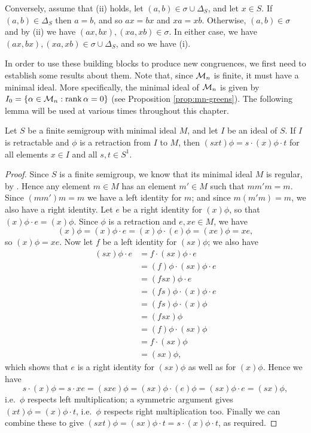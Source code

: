 Conversely, assume that (ii) holds, let $(a,b) \in \sigma \cup \Delta_S$, and
let $x \in S$.  If $(a,b) \in \Delta_S$ then $a=b$, and so $ax=bx$ and $xa=xb$.
Otherwise, $(a,b) \in \sigma$ and by (ii) we have $(ax,bx),(xa,xb) \in \sigma$.
In either case, we have $(ax,bx),(xa,xb) \in \sigma \cup \Delta_S$, and so we
have (i).

In order to use these building blocks to produce new congruences, we first need
to establish some results about them.  Note that, since $\mathcal{M}_n$ is finite, it
must have a minimal ideal.  More specifically, the minimal ideal of $\mathcal{M}_n$ is
given by $I_0 = \{\alpha \in \mathcal{M}_n : \operatorname{rank} \alpha = 0\}$ (see Proposition
\ref{prop:mn-greens}).  The following lemma will be used at various times
throughout this chapter.

\begin{lemma}
  \label{lem:retract-aux}
  Let $S$ be a finite semigroup with minimal ideal $M$, and let $I$ be
  an ideal of $S$.  If $I$ is retractable and $\phi$ is a
  retraction from $I$ to $M$, then $(sxt)\phi=s \cdot (x)\phi \cdot t$ for all
  elements $x \in I$ and all $s,t\in S^1$.
  \begin{proof}
    Since $S$ is a finite semigroup, we know that its minimal ideal $M$ is
    regular, by \cite[Proposition 3.1.4]{howie}.  Hence
    any element $m \in M$ has an element $m' \in M$ such that $mm'm = m$.  Since $(mm')m=m$ we
    have a left identity for $m$; and since $m(m'm) = m$, we also have a right
    identity.  Let $e$ be a right identity for $(x)\phi$, so that
    $(x)\phi \cdot e = (x)\phi$.  Since $\phi$ is a retraction and
    $e, xe \in M$, we have
    $$(x)\phi=(x)\phi \cdot e = (x)\phi \cdot (e)\phi = (xe)\phi = xe,$$
    so $(x)\phi = xe$.
    Now let $f$ be a left identity for $(sx)\phi$; we also
    have
    \begin{align*}
      (sx)\phi \cdot e & = f \cdot (sx)\phi \cdot e \\
      & = (f)\phi \cdot (sx)\phi \cdot e \\
      & = (fsx)\phi \cdot e \\
      & = (fs)\phi \cdot (x)\phi \cdot e \\
      & = (fs)\phi \cdot (x)\phi \\
      & = (fsx)\phi \\
      & = (f)\phi \cdot (sx)\phi \\
      & = f \cdot (sx)\phi \\
      & = (sx)\phi,
    \end{align*}
    which shows that $e$ is a right identity for $(sx)\phi$ as well as for
    $(x)\phi$.  Hence we have
    $$s \cdot (x)\phi = s \cdot xe = (sxe)\phi = (sx)\phi \cdot (e)\phi =
    (sx)\phi \cdot e = (sx)\phi,$$ i.e.~$\phi$ respects left multiplication; a
    symmetric argument gives $(xt)\phi = (x)\phi \cdot t$, i.e.~$\phi$ respects
    right multiplication too.  Finally we can combine these to give
    $(sxt)\phi = (sx)\phi \cdot t = s \cdot (x)\phi \cdot t$, as required.
  \end{proof}
\end{lemma}

